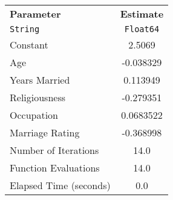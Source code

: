 \begin{tabular}{lc}
  \hline
  \textbf{Parameter} & \textbf{Estimate} \\
  \texttt{String} & \texttt{Float64} \\\hline
  Constant & 2.5069 \\
  Age & -0.038329 \\
  Years Married & 0.113949 \\
  Religiousness & -0.279351 \\
  Occupation & 0.0683522 \\
  Marriage Rating & -0.368998 \\
  Number of Iterations & 14.0 \\
  Function Evaluations & 14.0 \\
  Elapsed Time (seconds) & 0.0 \\\hline
\end{tabular}
